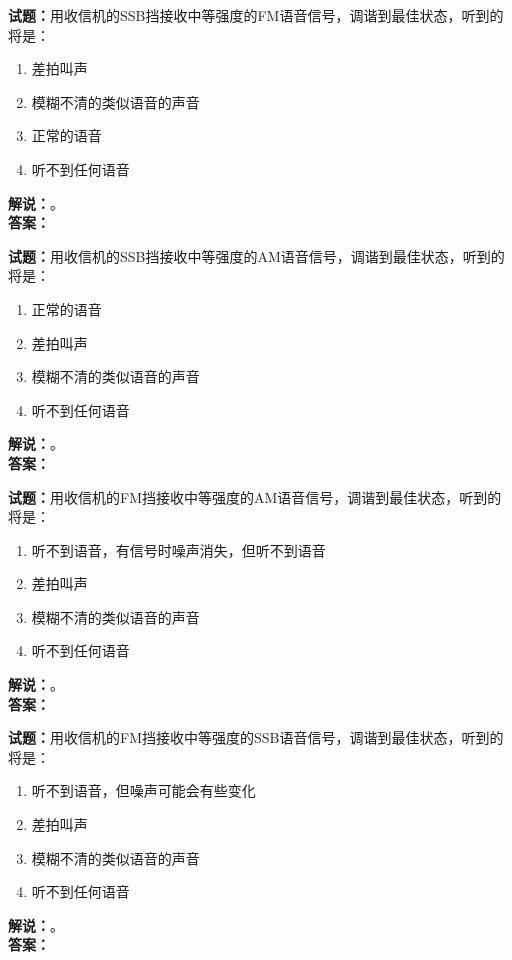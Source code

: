 \documentclass{ctexbook}
\begin{document}
\bigskip

\noindent\textbf{试题：}用收信机的SSB挡接收中等强度的FM语音信号，调谐到最佳状态，听到的将是：
\begin{enumerate}[leftmargin=3em]
  \item 差拍叫声
  \item 模糊不清的类似语音的声音
  \item 正常的语音
  \item 听不到任何语音
\end{enumerate}
\noindent\textbf{解说：}\textbf{}。\\\noindent\textbf{答案：}

\bigskip

\noindent\textbf{试题：}用收信机的SSB挡接收中等强度的AM语音信号，调谐到最佳状态，听到的将是：
\begin{enumerate}[leftmargin=3em]
  \item 正常的语音
  \item 差拍叫声
  \item 模糊不清的类似语音的声音
  \item 听不到任何语音
\end{enumerate}
\noindent\textbf{解说：}\textbf{}。\\\noindent\textbf{答案：}

\bigskip

\noindent\textbf{试题：}用收信机的FM挡接收中等强度的AM语音信号，调谐到最佳状态，听到的将是：
\begin{enumerate}[leftmargin=3em]
  \item 听不到语音，有信号时噪声消失，但听不到语音
  \item 差拍叫声
  \item 模糊不清的类似语音的声音
  \item 听不到任何语音
\end{enumerate}
\noindent\textbf{解说：}\textbf{}。\\\noindent\textbf{答案：}

\bigskip

\noindent\textbf{试题：}用收信机的FM挡接收中等强度的SSB语音信号，调谐到最佳状态，听到的将是：
\begin{enumerate}[leftmargin=3em]
  \item 听不到语音，但噪声可能会有些变化
  \item 差拍叫声
  \item 模糊不清的类似语音的声音
  \item 听不到任何语音
\end{enumerate}
\noindent\textbf{解说：}\textbf{}。\\\noindent\textbf{答案：}
\end{document}
